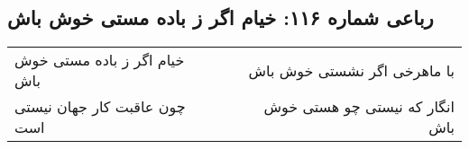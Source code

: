 \begin{center}
\section*{رباعی شماره ۱۱۶: خیام اگر ز باده مستی خوش باش}
\label{sec:sh116}
\begin{longtable}{l p{0.5cm} r}
خیام اگر ز باده مستی خوش باش
&&
با ماهرخی اگر نشستی خوش باش
\\
چون عاقبت کار جهان نیستی است
&&
انگار که نیستی چو هستی خوش باش
\\
\end{longtable}
\end{center}
